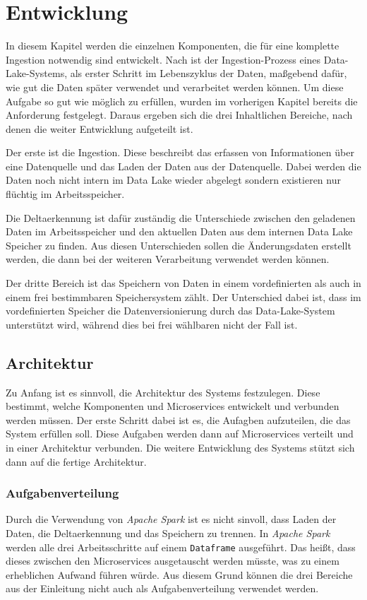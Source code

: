 \chapter{Entwicklung}
In diesem Kapitel werden die einzelnen Komponenten, die für eine komplette Ingestion notwendig sind entwickelt.
Nach \citeauthor{DL-Ing-Mgmt} ist der Ingestion-Prozess eines Data-Lake-Systems, als erster Schritt im Lebenszyklus der Daten, maßgebend dafür, wie gut die Daten später verwendet und verarbeitet werden können.
Um diese Aufgabe so gut wie möglich zu erfüllen, wurden im vorherigen Kapitel bereits die Anforderung festgelegt.
Daraus ergeben sich die drei Inhaltlichen Bereiche, nach denen die weiter Entwicklung aufgeteilt ist.

Der erste ist die Ingestion.
Diese beschreibt das erfassen von Informationen über eine Datenquelle und das Laden der Daten aus der Datenquelle.
Dabei werden die Daten noch nicht intern im Data Lake wieder abgelegt sondern existieren nur flüchtig im Arbeitsspeicher.

Die Deltaerkennung ist dafür zuständig die Unterschiede zwischen den geladenen Daten im Arbeitsspeicher und den aktuellen Daten aus dem internen Data Lake Speicher zu finden.
Aus diesen Unterschieden sollen die Änderungsdaten erstellt werden, die dann bei der weiteren Verarbeitung verwendet werden können.

Der dritte Bereich ist das Speichern von Daten in einem vordefinierten als auch in einem frei bestimmbaren Speichersystem zählt.
Der Unterschied dabei ist, dass im vordefinierten Speicher die Datenversionierung durch das Data-Lake-System unterstützt wird, während dies bei frei wählbaren nicht der Fall ist.

\section{Architektur}
\label{sec:arch}

Zu Anfang ist es sinnvoll, die Architektur des Systems festzulegen.
Diese bestimmt, welche Komponenten und Microservices entwickelt und verbunden werden müssen.
Der erste Schritt dabei ist es, die Aufagben aufzuteilen, die das System erfüllen soll.
Diese Aufgaben werden dann auf Microservices verteilt und in einer Architektur verbunden.
Die weitere Entwicklung des Systems stützt sich dann auf die fertige Architektur.

\subsection{Aufgabenverteilung}
Durch die Verwendung von \textit{Apache Spark} ist es nicht sinvoll, dass Laden der Daten, die Deltaerkennung und das Speichern zu trennen.
In \textit{Apache Spark} werden alle drei Arbeitsschritte auf einem \verb|Dataframe| ausgeführt.
Das heißt, dass dieses zwischen den Microservices ausgetauscht werden müsste, was zu einem erheblichen Aufwand führen würde.
Aus diesem Grund können die drei Bereiche aus der Einleitung nicht auch als Aufgabenverteilung verwendet werden.

